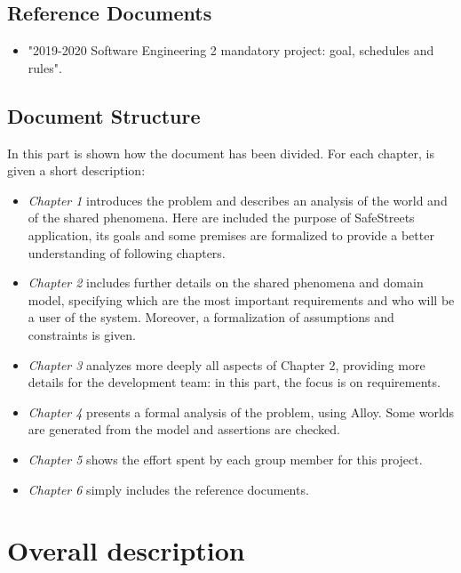 \documentclass{article}
\begin{document}
		\subsection{Reference Documents}
			\begin{itemize}
				\item "2019-2020 Software Engineering 2 mandatory project: goal, schedules and rules".
			\end{itemize}
			
		\subsection{Document Structure}
			In this part is shown how the document has been divided. For each chapter, is given a short description:
			\begin{itemize}
				\item \textit{Chapter 1} introduces the problem and describes an analysis of the world and of the shared phenomena. Here are included the purpose of SafeStreets application, its goals and some premises are formalized to provide a better understanding of following chapters.
				\item \textit{Chapter 2} includes further details on the shared phenomena and domain model, specifying which are the most important requirements and who will be a user of the system. Moreover, a formalization of assumptions and constraints is given.
				\item \textit{Chapter 3} analyzes more deeply all aspects of Chapter 2, providing more details for the development team: in this part, the focus is on requirements.
				\item \textit{Chapter 4} presents a formal analysis of the problem, using Alloy. Some worlds are generated from the model and assertions are checked.
				\item \textit{Chapter 5} shows the effort spent by each group member for this project.
				\item \textit{Chapter 6} simply includes the reference documents.
			\end{itemize}
	
	\newpage










	\section{Overall description}
\end{document}
